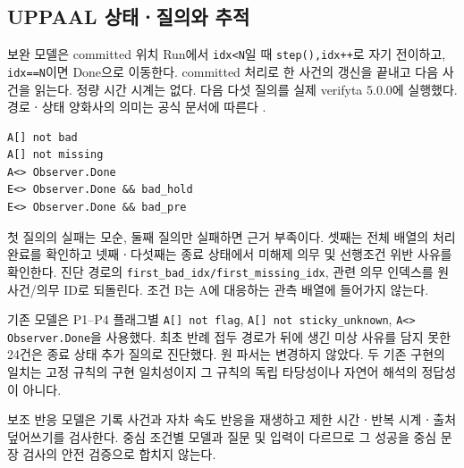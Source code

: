 \begin{revision}
\subsection{UPPAAL 상태ㆍ질의와 추적}
\label{sec:queries}
보완 모델은 committed 위치 Run에서 \texttt{idx<N}일 때 \texttt{step(),idx++}로 자기 전이하고, \texttt{idx==N}이면 Done으로 이동한다. committed 처리로 한 사건의 갱신을 끝내고 다음 사건을 읽는다. 정량 시간 시계는 없다. 다음 다섯 질의를 실제 verifyta 5.0.0에 실행했다. 경로ㆍ상태 양화사의 의미는 공식 문서에 따른다 \cite{uppaalqueries}.

\begin{lstlisting}[caption={보완 모델의 실제 queries.q.},label={lst:queries}]
A[] not bad
A[] not missing
A<> Observer.Done
E<> Observer.Done && bad_hold
E<> Observer.Done && bad_pre
\end{lstlisting}

첫 질의의 실패는 모순, 둘째 질의만 실패하면 근거 부족이다. 셋째는 전체 배열의 처리 완료를 확인하고 넷째ㆍ다섯째는 종료 상태에서 미해제 의무 및 선행조건 위반 사유를 확인한다. 진단 경로의 \texttt{first\_bad\_idx/first\_missing\_idx}, 관련 의무 인덱스를 원 사건/의무 ID로 되돌린다. 조건 B는 A에 대응하는 관측 배열에 들어가지 않는다.

기존 모델은 P1--P4 플래그별 \texttt{A[] not flag}, \texttt{A[] not sticky\_unknown}, \texttt{A<> Observer.Done}을 사용했다. 최초 반례 접두 경로가 뒤에 생긴 미상 사유를 담지 못한 24건은 종료 상태 추가 질의로 진단했다. 원 파서는 변경하지 않았다. 두 기존 구현의 일치는 고정 규칙의 구현 일치성이지 그 규칙의 독립 타당성이나 자연어 해석의 정답성이 아니다.

보조 반응 모델은 기록 사건과 자차 속도 반응을 재생하고 제한 시간ㆍ반복 시계ㆍ출처 덮어쓰기를 검사한다. 중심 조건별 모델과 질문 및 입력이 다르므로 그 성공을 중심 문장 검사의 안전 검증으로 합치지 않는다.
\end{revision}
